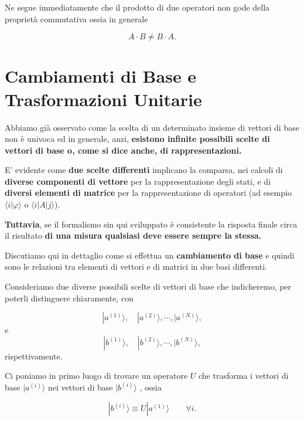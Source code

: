 \documentclass[a4paper,12pt,oneside]{book}
\begin{document}
Ne segue immediatamente che il prodotto di due operatori non gode della proprietà commutativa ossia in generale

\begin{equation}
A \cdot B \neq B \cdot A . 
\end{equation}

\section{Cambiamenti di Base e Trasformazioni Unitarie}

Abbiamo già osservato come la scelta di un determinato insieme di vettori di base non è univoca ed in generale, anzi, \textbf{esistono infinite possibili scelte di vettori di base o, come si dice anche, di rappresentazioni.}

E' evidente come \textbf{due scelte differenti }implicano la comparsa, nei calcoli di \textbf{diverse componenti di vettore} per la rappresentazione degli stati, e di \textbf{diversi elementi di matrice} per la rappresentazione di operatori (ad esempio $\langle i | \varphi \rangle $ o  $ \langle i | A | j \rangle $).

\textbf{Tuttavia}, se il formalismo sin qui sviluppato è consistente la risposta finale circa il risultato \textbf{di una misura qualsiasi deve essere sempre la stessa.}

Discutiamo qui in dettaglio come si effettua un \textbf{cambiamento di base} e quindi sono le relazioni tra elementi di vettori e di matrici in due basi differenti.

Consideriamo due diverse possibili scelte di vettori di base che indicheremo, per poterli distinguere chiaramente, con 

\begin{equation}
| a^{(1)} \rangle , \quad  | a^{(2)} \rangle , \cdots , | a^{(N)} \rangle ,
\end{equation}
e
\begin{equation}
| b^{(1)} \rangle , \quad | b^{(2)} \rangle , \cdots , | b^{(N)} \rangle ,
\end{equation}
rispettivamente.

Ci poniamo in primo luogo di trovare un operatore $U$ che trasforma i vettori di base $| a^{(i)} \rangle$ nei vettori di base $| b^{(i)} \rangle $ , ossia 

\begin{equation}
| b^{(i)} \rangle \equiv U | a^{(1)} \rangle \qquad \forall i .
\end{equation}
\end{document}
